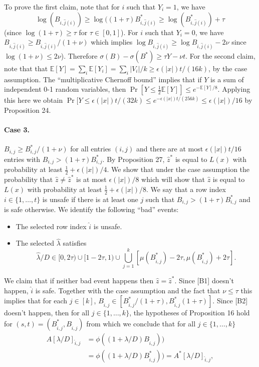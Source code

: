 \documentclass[10pt,a4paper]{article}
\begin{document}
To prove the first claim, note that for $i$ such that $Y_i=1$, we have
\[\log(B_{i,\hat j(i)})\ge\log((1+\tau)B^*_{i,\hat j(i)}\ge\log(B^*_{i,\hat j(i)})+\tau\]
(since $\log(1+\tau)\ge\tau$ for $\tau\in[0,1]$). For $i$ such that $Y_i=0$, we have $B_{i,\hat j(i)}\ge B_{i,\hat j(i)}/(1+\nu)$ which implies $\log B_{i,\hat j(i)}\ge\log B_{i,\hat j(i)}-2\nu$ since $\log(1+\nu)\le2\nu$). Therefore $\sigma(B)-\sigma(B^*)\ge\tau Y-\nu t$.
For the second claim, note that that $\mathbb E[Y]=\sum_i\mathbb E[Y_i]=\sum_i|V_i|/k\ge\epsilon(|x|)t/(16k)$, by the case assumption. The ``multiplicative Chernoff bound'' implies that if $Y$ is a sum of independent 0-1 random variables, then $\Pr[Y\le\frac12\mathbb E[Y]]\le e^{-\mathbb E[Y]/8}$. Applying this here we obtain $\Pr[Y\le\epsilon(|x|)t/(32k)\le e^{-\epsilon(|x|)t/(256k)}\le\epsilon(|x|)/16$ by Proposition 24.
\paragraph{Case 3.} $B_{i,j}\ge B^*_{i,j}/(1+\nu)$ for all entries $(i,j)$ and there are at most $\epsilon(|x|)t/16$ entries with $B_{i,j}>(1+\tau)B^*_{i,j}$. By Proposition 27, $\hat z^*$ is equal to $L(x)$ with probability at least $\frac12+\epsilon(|x|)/4$. We show that under the case assumption the probability that $\hat z\ne\hat z^*$ is at most $\epsilon(|x|)/8$ which will show that $\hat z$ is equal to $L(x)$ with probability at least $\frac12+\epsilon(|x|)/8$.
We say that a row index $i\in\{1,\ldots,t\}$ is unsafe if there is at least one $j$ such that $B_{i,j}>(1+\tau)B^*_{i,j}$ and is safe otherwise. We identify the following ``bad'' events:
\begin{itemize}\item[B1] The selected row index $\hat i$ is unsafe.
\item[B2] The selected $\hat\lambda$ satisfies
\[\hat\lambda/D\in[0,2\tau)\cup[1-2\tau,1)\cup\bigcup_{j=1}^k[\mu(B^*_{\hat i,j})-2\tau,\mu(B^*_{\hat i,j})+2\tau].\]\end{itemize}
We claim that if neither bad event happens then $\hat z=\hat z^*$. Since [B1] doesn't happen, $\hat i$ is safe. Together with the case assumption and the fact that $\nu\le\tau$ this implies that for each $j\in[k]$, $B_{\hat i,j}\in[B^*_{\hat i,j}/(1+\tau),B^*_{\hat i,j}(1+\tau)]$. Since [B2] doesn't happen, then for all $j\in\{1,\ldots,k\}$, the hypotheses of Proposition 16 hold for $(s,t)=(B^*_{\hat i,j},B_{\hat i,j})$ from which we conclude that for all $j\in\{1,\ldots,k\}$
\begin{align*}A[\lambda/D]_{\hat i,j}&=\phi((1+\lambda/D)B_{\hat i,j}))\\&=\phi((1+\lambda/D)B^*_{\hat i,j}))=A^*[\lambda/D]_{\hat i,j},\end{align*}
\end{document}
